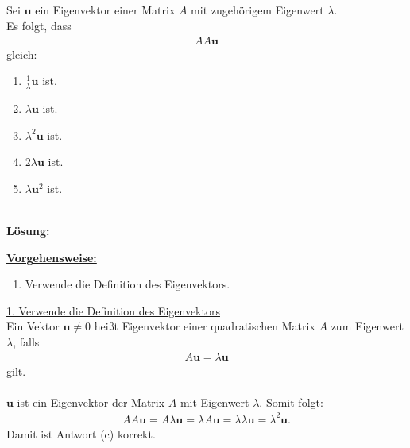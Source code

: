 \newpage

\subsection*{}
Sei $\mathbf{u} $ ein Eigenvektor einer Matrix $A$ mit zugehörigem Eigenwert $\lambda$.
\\
Es folgt, dass 
\begin{align*}
	AA \mathbf{u}
\end{align*}
gleich:
\renewcommand{\labelenumi}{(\alph{enumi})}
\begin{enumerate}
	\item 
	$ \frac{1}{\lambda} \mathbf{u} $ ist.
	\item 
	$ \lambda \mathbf{u} $ ist.
	\item
	$ \lambda^2 \mathbf{u}$ ist.
	\item
	$ 2\lambda \mathbf{u} $ ist.
	\item 
	$ \lambda \mathbf{u}^2 $ ist.
\end{enumerate}
\ \\
\textbf{Lösung:}
\begin{mdframed}
\underline{\textbf{Vorgehensweise:}}
\renewcommand{\labelenumi}{\theenumi.}
\begin{enumerate}
\item Verwende die Definition des Eigenvektors.
\end{enumerate}
\end{mdframed}

\underline{1. Verwende die Definition des Eigenvektors}\\
Ein Vektor $\mathbf{u} \neq 0$ heißt Eigenvektor einer quadratischen Matrix $A$ zum Eigenwert $\lambda$, falls
\begin{align*}
	A \mathbf{u} = \lambda \mathbf{u}
\end{align*}
gilt.\\
\\
$\mathbf{u}$ ist ein Eigenvektor der Matrix $A$ mit Eigenwert $\lambda $.
Somit folgt:
\begin{align*}
	A A \mathbf{u} 
	=
	A \lambda \mathbf{u} 
	= 
	\lambda A \mathbf{u} 
	= 
	\lambda \lambda \mathbf{u}
	= 
	\lambda^2 \mathbf{u}.
\end{align*}
Damit ist Antwort (c) korrekt.



\newpage
